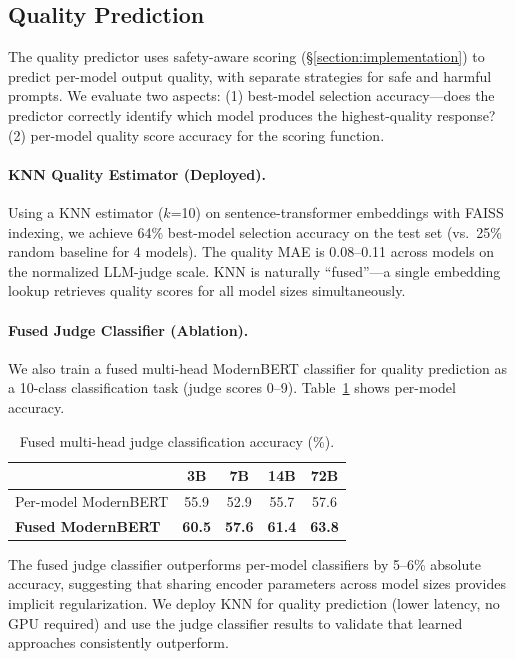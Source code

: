 \documentclass[letterpaper, anonymous, twocolumn, 10pt]{article}
\begin{document}
\subsection{Quality Prediction} \label{section:quality_eval}

The quality predictor uses safety-aware scoring (\S\ref{section:implementation}) to predict per-model output quality, with separate strategies for safe and harmful prompts.
We evaluate two aspects: (1) best-model selection accuracy---does the predictor correctly identify which model produces the highest-quality response? (2) per-model quality score accuracy for the scoring function.

\paragraph{KNN Quality Estimator (Deployed).}
Using a KNN estimator ($k$=10) on sentence-transformer embeddings with FAISS indexing, we achieve 64\% best-model selection accuracy on the test set (vs.\ 25\% random baseline for 4 models).
The quality MAE is 0.08--0.11 across models on the normalized LLM-judge scale.
KNN is naturally ``fused''---a single embedding lookup retrieves quality scores for all model sizes simultaneously.

\paragraph{Fused Judge Classifier (Ablation).}
We also train a fused multi-head ModernBERT classifier for quality prediction as a 10-class classification task (judge scores 0--9).
Table~\ref{tab:judge_results} shows per-model accuracy.

\begin{table}[t]
\centering
\small
\caption{Fused multi-head judge classification accuracy (\%).}
\label{tab:judge_results}
\begin{tabular}{lcccc}
\hline
& 3B & 7B & 14B & 72B \\
\hline
Per-model ModernBERT & 55.9 & 52.9 & 55.7 & 57.6 \\
\textbf{Fused ModernBERT} & \textbf{60.5} & \textbf{57.6} & \textbf{61.4} & \textbf{63.8} \\
\hline
\end{tabular}
\end{table}

The fused judge classifier outperforms per-model classifiers by 5--6\% absolute accuracy, suggesting that sharing encoder parameters across model sizes provides implicit regularization.
We deploy KNN for quality prediction (lower latency, no GPU required) and use the judge classifier results to validate that learned approaches consistently outperform.
\end{document}
